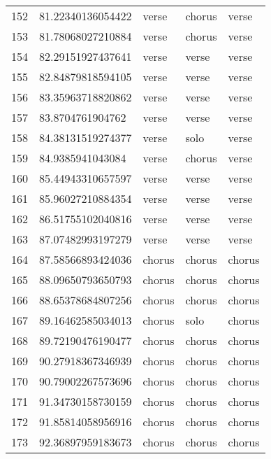 \begin{table}[]
\begin{tabular}{lllll}
    152  & 81.22340136054422  & verse        & chorus          & verse          \\
    153  & 81.78068027210884  & verse        & chorus          & verse          \\
    154  & 82.29151927437641  & verse        & verse           & verse          \\
    155  & 82.84879818594105  & verse        & verse           & verse          \\
    156  & 83.35963718820862  & verse        & verse           & verse          \\
    157  & 83.8704761904762   & verse        & verse           & verse          \\
    158  & 84.38131519274377  & verse        & solo            & verse          \\
    159  & 84.9385941043084   & verse        & chorus          & verse          \\
    160  & 85.44943310657597  & verse        & verse           & verse          \\
    161  & 85.96027210884354  & verse        & verse           & verse          \\
    162  & 86.51755102040816  & verse        & verse           & verse          \\
    163  & 87.07482993197279  & verse        & verse           & verse          \\
    164  & 87.58566893424036  & chorus       & chorus          & chorus         \\
    165  & 88.09650793650793  & chorus       & chorus          & chorus         \\
    166  & 88.65378684807256  & chorus       & chorus          & chorus         \\
    167  & 89.16462585034013  & chorus       & solo            & chorus         \\
    168  & 89.72190476190477  & chorus       & chorus          & chorus         \\
    169  & 90.27918367346939  & chorus       & chorus          & chorus         \\
    170  & 90.79002267573696  & chorus       & chorus          & chorus         \\
    171  & 91.34730158730159  & chorus       & chorus          & chorus         \\
    172  & 91.85814058956916  & chorus       & chorus          & chorus         \\
    173  & 92.36897959183673  & chorus       & chorus          & chorus         \\

\end{tabular}
\end{table}
